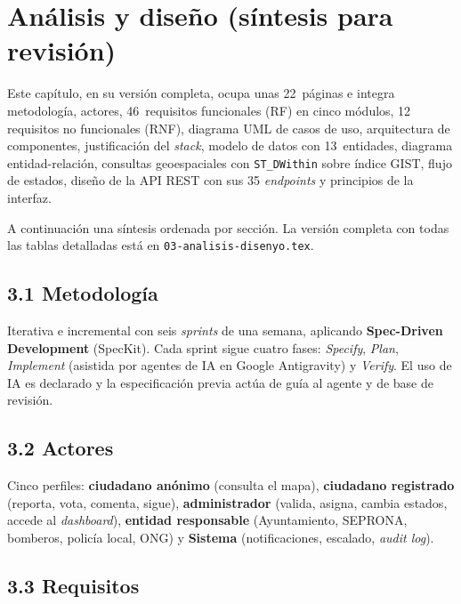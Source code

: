 
\chapter{Análisis y diseño (síntesis para revisión)}
\label{ch:analisis-disenyo-resumen}

Este capítulo, en su versión completa, ocupa unas 22~páginas e integra metodología, actores, 46~requisitos funcionales (RF) en cinco módulos, 12 requisitos no funcionales (RNF), diagrama UML de casos de uso, arquitectura de componentes, justificación del \textit{stack}, modelo de datos con 13~entidades, diagrama entidad-relación, consultas geoespaciales con \texttt{ST\_DWithin} sobre índice GIST, flujo de estados, diseño de la API REST con sus 35 \textit{endpoints} y principios de la interfaz.

A continuación una síntesis ordenada por sección. La versión completa con todas las tablas detalladas está en \texttt{03-analisis-disenyo.tex}.

\section*{3.1 Metodología}

Iterativa e incremental con seis \textit{sprints} de una semana, aplicando \textbf{Spec-Driven Development} (SpecKit). Cada sprint sigue cuatro fases: \textit{Specify}, \textit{Plan}, \textit{Implement} (asistida por agentes de IA en Google Antigravity) y \textit{Verify}. El uso de IA es declarado y la especificación previa actúa de guía al agente y de base de revisión.

\section*{3.2 Actores}

Cinco perfiles: \textbf{ciudadano anónimo} (consulta el mapa), \textbf{ciudadano registrado} (reporta, vota, comenta, sigue), \textbf{administrador} (valida, asigna, cambia estados, accede al \textit{dashboard}), \textbf{entidad responsable} (Ayuntamiento, SEPRONA, bomberos, policía local, ONG) y \textbf{Sistema} (notificaciones, escalado, \textit{audit log}).

\section*{3.3 Requisitos}

